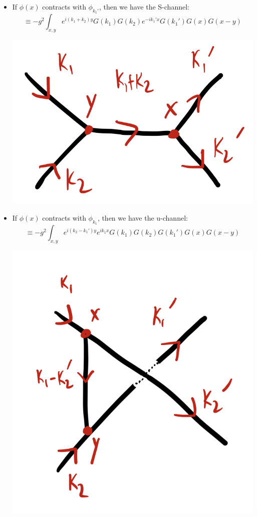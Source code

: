 \begin{itemize}
    \item If $\phi(x)$ contracts with $\phi_{k_1'}$, then we have the S-channel:
    \begin{equation}
        \equiv -g^2\int_{x, y}e^{i(k_1 + k_2)y}G(k_1)G(k_2)e^{-ik_1'x}G(k_1')G(x)G(x-y)
    \end{equation}
    \begin{center}
        \includegraphics[scale=0.35]{Lectures/Figures/lec17-schannel.png}
    \end{center}

    \item If $\phi(x)$ contracts with $\phi_{k_1}$, then we have the u-channel:
    \begin{equation}
        \equiv -g^2\int_{x, y}e^{i(k_2 - k_1')y}e^{ik_1x}G(k_1)G(k_2)G(k_1')G(x)G(x-y)
    \end{equation}
    \begin{center}
        \includegraphics[scale=0.35]{Lectures/Figures/lec17-uchannel.png}
    \end{center}


\end{itemize}

